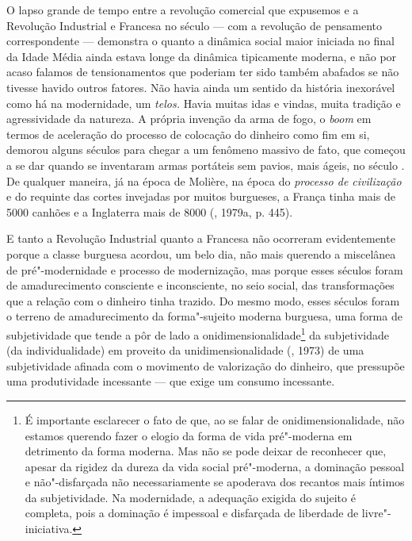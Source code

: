 O lapso grande de tempo entre a revolução comercial que expusemos e a
Revolução Industrial e Francesa no século  --- com a revolução de
pensamento correspondente --- demonstra o quanto a dinâmica social maior
iniciada no final da Idade Média ainda estava longe da dinâmica
tipicamente moderna, e não por acaso falamos de tensionamentos que
poderiam ter sido também abafados se não tivesse havido outros fatores.
Não havia ainda um sentido da história inexorável como há na
modernidade, um \emph{telos.} Havia muitas idas e vindas, muita tradição
e agressividade da natureza. A própria invenção da arma de fogo, o
\emph{boom} em termos de aceleração do processo de colocação do dinheiro
como fim em si, demorou alguns séculos para chegar a um fenômeno massivo
de fato, que começou a se dar quando se inventaram armas portáteis sem
pavios, mais ágeis, no século . De qualquer maneira, já na época de
Molière, na época do \emph{processo de civilização} e do
requinte das cortes invejadas por muitos burgueses, a França tinha mais
de 5000 canhões e a Inglaterra mais de 8000 (, 1979a, p. 445).

E tanto a Revolução Industrial quanto a Francesa não ocorreram
evidentemente porque a classe burguesa acordou, um belo dia, não mais
querendo a miscelânea de pré"-modernidade e processo de modernização, mas
porque esses séculos foram de amadurecimento consciente e inconsciente,
no seio social, das transformações que a relação com o dinheiro tinha
trazido. Do mesmo modo, esses séculos foram o terreno de amadurecimento
da forma"-sujeito moderna burguesa, uma forma de subjetividade que tende
a pôr de lado a onidimensionalidade\footnote{É importante esclarecer o
  fato de que, ao se falar de onidimensionalidade, não estamos querendo
  fazer o elogio da forma de vida pré"-moderna em detrimento da forma
  moderna. Mas não se pode deixar de reconhecer que, apesar da rigidez
  da dureza da vida social pré"-moderna, a dominação pessoal e
  não"-disfarçada não necessariamente se apoderava dos recantos mais
  íntimos da subjetividade. Na modernidade, a adequação exigida do
  sujeito é completa, pois a dominação é impessoal e disfarçada de
  liberdade de livre"-iniciativa.} da subjetividade (da individualidade)
em proveito da unidimensionalidade (, 1973) de uma subjetividade
afinada com o movimento de valorização do dinheiro, que pressupõe uma
produtividade incessante --- que exige um consumo incessante.

